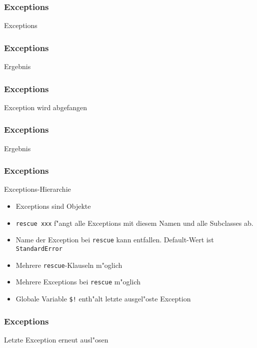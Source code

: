 \documentclass{beamer}
\begin{document}
\lstset{language=Ruby}
\lstset{basicstyle=\small,numbers=none, numberstyle=\tiny, numbersep=5pt}
\begin{frame}
  \frametitle{Exceptions}
  Exceptions
  
\end{frame}

\begin{frame}
  \frametitle{Exceptions}
  Ergebnis
  
\end{frame}

\begin{frame}
  \frametitle{Exceptions}
  Exception wird abgefangen
  
\end{frame}

\begin{frame}
  \frametitle{Exceptions}
  Ergebnis
  
\end{frame}

\begin{frame}
  \frametitle{Exceptions}
  Exceptions-Hierarchie
  
\end{frame}


\begin{frame}
  \begin{itemize}
    \item Exceptions sind Objekte
    \pause
    \item \texttt{rescue xxx} f"angt alle Exceptions mit diesem Namen und alle Subclasses ab.
    \pause
    \item Name der Exception bei \texttt{rescue} kann entfallen. Default-Wert ist \texttt{StandardError}
    \pause
    \item Mehrere \texttt{rescue}-Klauseln m"oglich
    \pause
    \item Mehrere Exceptions bei \texttt{rescue} m"oglich
    \pause
    \item Globale Variable \texttt{\$!} enth"alt letzte ausgel"oste Exception
  \end{itemize}
\end{frame}

\begin{frame}
  \frametitle{Exceptions}
  Letzte Exception erneut ausl"osen
  
\end{frame}
\end{document}
